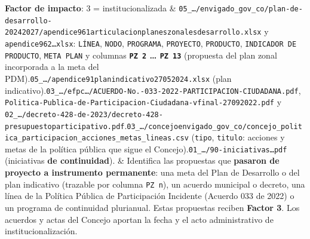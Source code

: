 \documentclass[11pt,a4paper]{article}
\begin{document}
{\begin{longtable}
\textbf{Factor de impacto}: 3 = institucionalizada & \texttt{05\_\allowbreak{}\ldots{}/\allowbreak{}envigado\_\allowbreak{}gov\_\allowbreak{}co/\allowbreak{}plan-\allowbreak{}de-\allowbreak{}desarrollo-\allowbreak{}20242027/\allowbreak{}apendice961articulacionplaneszonalesdesarrollo.\allowbreak{}xlsx} y \texttt{apendice962\ldots{}xlsx}: \texttt{LÍNEA}, \texttt{NODO}, \texttt{PROGRAMA}, \texttt{PROYECTO}, \texttt{PRODUCTO}, \texttt{INDICADOR DE PRODUCTO}, \texttt{META PLAN} y columnas \textbf{\texttt{PZ 2} \ldots{} \texttt{PZ 13}} (propuesta del plan zonal incorporada a la meta del PDM).\newline \texttt{05\_\allowbreak{}\ldots{}/\allowbreak{}apendice91planindicativo27052024.\allowbreak{}xlsx} (plan indicativo).\newline \texttt{03\_\allowbreak{}\ldots{}/\allowbreak{}efpc\ldots{}/\allowbreak{}ACUERDO-\allowbreak{}No.\allowbreak{}-\allowbreak{}033-\allowbreak{}2022-\allowbreak{}PARTICIPACION-\allowbreak{}CIUDADANA.\allowbreak{}pdf}, \texttt{Politica-\allowbreak{}Publica-\allowbreak{}de-\allowbreak{}Participacion-\allowbreak{}Ciudadana-\allowbreak{}vfinal-\allowbreak{}27092022.\allowbreak{}pdf} y \texttt{02\_\allowbreak{}\ldots{}/\allowbreak{}decreto-\allowbreak{}428-\allowbreak{}de-\allowbreak{}2023/\allowbreak{}decreto-\allowbreak{}428-\allowbreak{}presupuestoparticipativo.\allowbreak{}pdf}.\newline \texttt{03\_\allowbreak{}\ldots{}/\allowbreak{}concejoenvigado\_\allowbreak{}gov\_\allowbreak{}co/\allowbreak{}concejo\_\allowbreak{}politica\_\allowbreak{}participacion\_\allowbreak{}acciones\_\allowbreak{}metas\_\allowbreak{}lineas.\allowbreak{}csv} (\texttt{tipo}, \texttt{titulo}: acciones y metas de la política pública que sigue el Concejo).\newline \texttt{01\_\allowbreak{}\ldots{}/\allowbreak{}90-\allowbreak{}iniciativas\ldots{}pdf} (iniciativas \textbf{de continuidad}). & Identifica las propuestas que \textbf{pasaron de proyecto a instrumento permanente}: una meta del Plan de Desarrollo o del plan indicativo (trazable por columna \texttt{PZ n}), un acuerdo municipal o decreto, una línea de la Política Pública de Participación Incidente (Acuerdo 033 de 2022) o un programa de continuidad plurianual. Estas propuestas reciben \textbf{Factor 3}. Los acuerdos y actas del Concejo aportan la fecha y el acto administrativo de institucionalización. \\

\end{longtable}}
\end{document}
